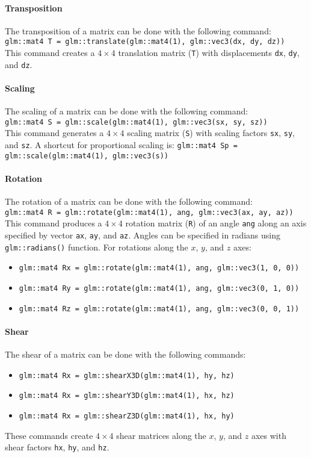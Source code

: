 \paragraph*{Transposition}
The transposition of a matrix can be done with the following command: 
\texttt{glm::mat4 T = glm::translate(glm::mat4(1), glm::vec3(dx, dy, dz))} \\
This command creates a $4 \times 4$ translation matrix (\texttt{T}) with displacements \texttt{dx}, \texttt{dy}, and \texttt{dz}.

\paragraph*{Scaling}
The scaling of a matrix can be done with the following command: \\
\texttt{glm::mat4 S = glm::scale(glm::mat4(1), glm::vec3(sx, sy, sz))} \\
This command generates a $4 \times 4$ scaling matrix (\texttt{S}) with scaling factors \texttt{sx}, \texttt{sy}, and \texttt{sz}. 
A shortcut for proportional scaling is:
\texttt{glm::mat4 Sp = glm::scale(glm::mat4(1), glm::vec3(s))}

\paragraph*{Rotation}
The rotation of a matrix can be done with the following command: \\
\texttt{glm::mat4 R = glm::rotate(glm::mat4(1), ang, glm::vec3(ax, ay, az))} \\
This command produces a $4 \times 4$ rotation matrix (\texttt{R}) of an angle \texttt{ang} along an axis specified by vector \texttt{ax}, \texttt{ay}, and \texttt{az}. 
Angles can be specified in radians using \texttt{glm::radians()} function. 
For rotations along the $x$, $y$, and $z$ axes:
\begin{itemize}
    \item \texttt{glm::mat4 Rx = glm::rotate(glm::mat4(1), ang, glm::vec3(1, 0, 0))}
    \item \texttt{glm::mat4 Ry = glm::rotate(glm::mat4(1), ang, glm::vec3(0, 1, 0))}
    \item \texttt{glm::mat4 Rz = glm::rotate(glm::mat4(1), ang, glm::vec3(0, 0, 1))}
\end{itemize}

\paragraph*{Shear}
The shear of a matrix can be done with the following commands:
\begin{itemize}
    \item \texttt{glm::mat4 Rx = glm::shearX3D(glm::mat4(1), hy, hz)}
    \item \texttt{glm::mat4 Rx = glm::shearY3D(glm::mat4(1), hx, hz)}
    \item \texttt{glm::mat4 Rx = glm::shearZ3D(glm::mat4(1), hx, hy)}
\end{itemize}
These commands create $4 \times 4$ shear matrices along the $x$, $y$, and $z$ axes with shear factors \texttt{hx}, \texttt{hy}, and \texttt{hz}.